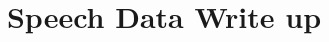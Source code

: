 \documentclass [12pt,letterpaper]{report}
\title{Speech Data Write up}
\author{}
\begin{document}


\nocite{*}
%
%
\end{document}
